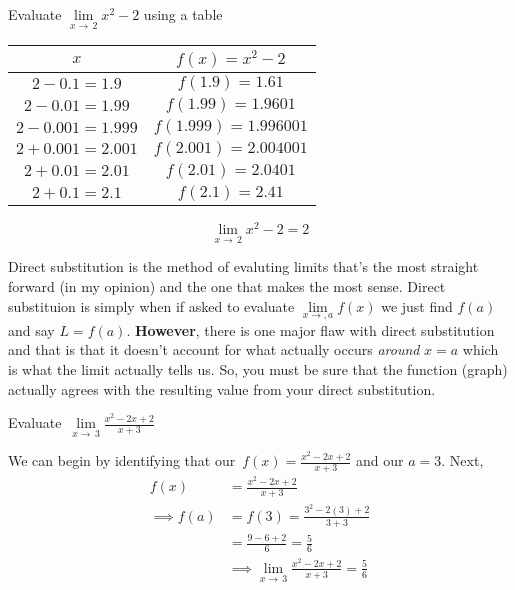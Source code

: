 \documentclass[addpoints]{exam}
\begin{document}
\newpage
\begin{questions}
	\question Evaluate $\lim\limits_{x\to\,2} x^2 - 2$ using a table
	\begin{solution}[2.5in]
		\begin{minipage}{0.45\linewidth}
			\begin{tabular}{|c|c|}
				\hline
				$x$                 & $f(x)=x^2-2$          \\
				\hline
				$2-0.1 = 1.9$       & $f(1.9) = 1.61$       \\
				\hline
				$2-0.01 = 1.99$     & $f(1.99) = 1.9601$    \\
				\hline
				$2-0.001 = 1.999$   & $f(1.999) = 1.996001$ \\
				\hline
				$2 + 0.001 = 2.001$ & $f(2.001) = 2.004001$ \\
				\hline
				$2 + 0.01 = 2.01$   & $f(2.01) = 2.0401$    \\
				\hline
				$2 + 0.1 = 2.1$     & $f(2.1) = 2.41$       \\
				\hline
			\end{tabular}
		\end{minipage}
		\hfill
		\begin{minipage}{0.45\linewidth}
			\[\boxed{\lim\limits_{x\to\,2}x^2-2=2}\]
		\end{minipage}
	\end{solution}
\end{questions}
\begin{tcolorbox}[breakable, title=DIRECT SUBSTITUTION, colframe=black, sharp corners, colback=white, colbacktitle=white, coltitle=black]
	Direct substitution is the method of evaluting limits that's the most straight forward (in my opinion) and the one that makes the most sense. Direct substituion is simply when if asked to evaluate $\lim\limits_{x\to,a} f(x)$ we just find $f(a)$ and say $L=f(a)$. \textbf{However}, there is one major flaw with direct substitution and that is that it doesn't account for what actually occurs \textit{around} $x=a$ which is what the limit actually tells us. So, you must be sure that the function (graph) actually agrees with the resulting value from your direct substitution.
\end{tcolorbox}
\begin{questions}
	\question Evaluate $\displaystyle\,\lim\limits_{x\to\,3} \frac{x^2-2x+2}{x+3}$
	\begin{solution}[2.5in]
		We can begin by identifying that our $\displaystyle\, f(x)=\frac{x^2-2x+2}{x+3}$ and our $a=3$. Next,
		\begin{align*}
			f(x)          & = \frac{x^2-2x+2}{x+3}                                                    \\
			\implies f(a) & = f(3) = \frac{3^2-2(3)+2}{3+3}                                           \\
			              & = \frac{9-6+2}{6} = \frac{5}{6}                                           \\
			              & \implies \boxed{\lim\limits_{x\to\,3} \frac{x^2-2x+2}{x+3} = \frac{5}{6}}
		\end{align*}
	\end{solution}
\end{questions}
\end{document}
